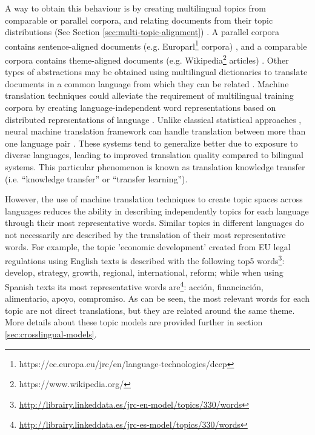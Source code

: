 A way to obtain this behaviour is by creating multilingual topics from comparable or parallel corpora, and relating documents from their topic distributions (See Section \ref{sec:multi-topic-alignment}) \citep{Graber2009, Boyd-Graber2010, Vulic2015}. A parallel corpora contains sentence-aligned documents (e.g. Europarl\footnote{https://ec.europa.eu/jrc/en/language-technologies/dcep} corpora) \citep{Steinberger2014}, and a comparable corpora contains theme-aligned documents (e.g. Wikipedia\footnote{https://www.wikipedia.org/} articles) \citep{Ni2009, Ni:2011:CLT:1935826.1935887}. Other types of abstractions may be obtained using multilingual dictionaries to translate documents in a common language from which they can be related \citep{errez2016, Liu2015a, Ma2017}. Machine translation techniques could alleviate the requirement of multilingual training corpora by creating language-independent word representations based on distributed representations of language \citep{Dabre2020ASO}. Unlike classical statistical approaches \citep{nakov-ng-2009-improved}, neural machine translation framework can handle translation between more than one language pair \citep{ChenLiu2018, neubig-hu-2018-rapid}. These systems tend to generalize better due to exposure to diverse languages, leading to improved translation quality compared to bilingual systems. This particular phenomenon is known as translation knowledge transfer \citep{Pan2010} (i.e. “knowledge transfer” or “transfer learning”). 

However, the use of machine translation techniques to create topic spaces across languages reduces the ability in describing independently topics for each language through their most representative words. Similar topics in different languages do not necessarily are described by the translation of their most representative words. For example, the topic 'economic development' created from EU legal regulations using English texts is described with the following top5 words\footnote{\url{http://librairy.linkeddata.es/jrc-en-model/topics/330/words}}: develop, strategy, growth, regional, international, reform; while when using Spanish texts its most representative words are\footnote{\url{http://librairy.linkeddata.es/jrc-es-model/topics/330/words}}: acción, financiación, alimentario, apoyo, compromiso. As can be seen, the most relevant words for each topic are not direct translations, but they are related around the same theme. More details about these topic models are provided further in section \ref{sec:crosslingual-models}. 

